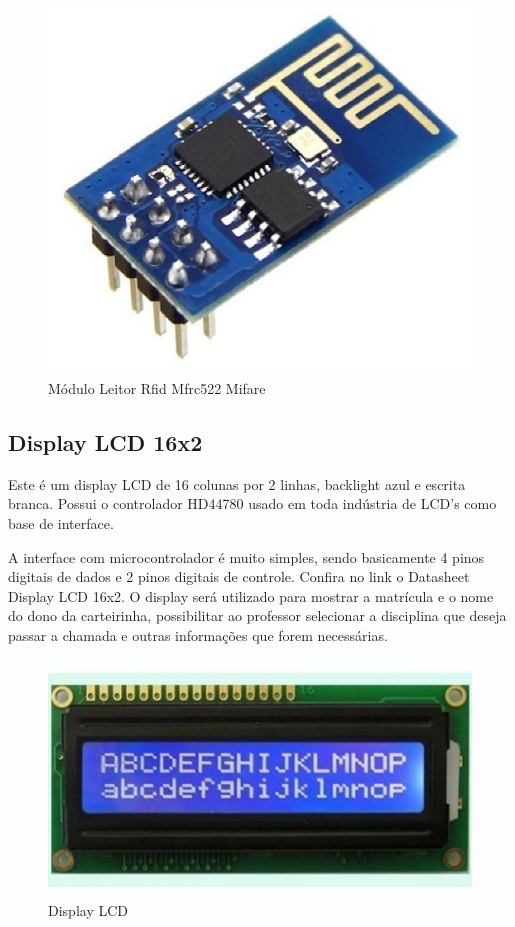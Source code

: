 \begin{figure}[!h]
  \centering
  \includegraphics[keepaspectratio=true,scale=0.5]{figuras/wifi.eps}
  \caption{Módulo Leitor Rfid Mfrc522 Mifare}
\end{figure}


\subsection{Display LCD 16x2}
Este é um display LCD de 16 colunas por 2 linhas, backlight azul e escrita branca. Possui o controlador HD44780 usado em toda indústria de LCD's como base de interface.

A interface com microcontrolador é muito simples, sendo basicamente 4 pinos digitais de dados e 2 pinos digitais de controle. Confira no link o Datasheet Display LCD 16x2. O display será utilizado para mostrar a matrícula e o nome do dono da carteirinha, possibilitar ao professor selecionar a disciplina que deseja passar a chamada e outras informações que forem necessárias.

\begin{figure}[!h]
  \centering
  \includegraphics[keepaspectratio=true,scale=0.45]{figuras/lcd.eps}
  \caption{Display LCD}
\end{figure}

